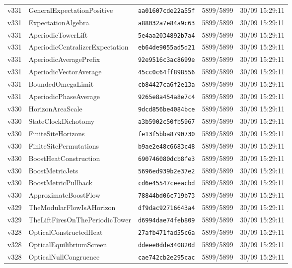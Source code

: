 \documentclass[11pt]{article}
\theoremstyle{definition}\newtheorem{deriv}{Derivation}
\begin{document}
{\begin{longtable}{@{}lllll@{}}
v331 & GeneralExpectationPositive & \texttt{aa01607cde22a55f} & 5899/5899 & 30/09 15:29:11 \\
v331 & ExpectationAlgebra & \texttt{a88032a7e84a9c63} & 5899/5899 & 30/09 15:29:11 \\
v331 & AperiodicTowerLift & \texttt{5e4aa2034892b7a4} & 5899/5899 & 30/09 15:29:11 \\
v331 & AperiodicCentralizerExpectation & \texttt{eb64de9055ad5d21} & 5899/5899 & 30/09 15:29:11 \\
v331 & AperiodicAveragePrefix & \texttt{92e9516c3ac8699e} & 5899/5899 & 30/09 15:29:11 \\
v331 & AperiodicVectorAverage & \texttt{45cc0c64ff898556} & 5899/5899 & 30/09 15:29:11 \\
v331 & BoundedOmegaLimit & \texttt{cb84427ca6f2e13a} & 5899/5899 & 30/09 15:29:11 \\
v331 & AperiodicPhaseAverage & \texttt{9265e8a454a8e7c4} & 5899/5899 & 30/09 15:29:11 \\
v330 & HorizonAreaScale & \texttt{9dcd856be4084bce} & 5899/5899 & 30/09 15:29:11 \\
v330 & StateClockDichotomy & \texttt{a3b5902c50fb5967} & 5899/5899 & 30/09 15:29:11 \\
v330 & FiniteSiteHorizons & \texttt{fe13f5bba8790730} & 5899/5899 & 30/09 15:29:11 \\
v330 & FiniteSitePermutations & \texttt{b9ae2e48c6683c48} & 5899/5899 & 30/09 15:29:11 \\
v330 & BoostHeatConstruction & \texttt{690746080dcb8fe3} & 5899/5899 & 30/09 15:29:11 \\
v330 & BoostMetricJets & \texttt{5696ed939b2e37e2} & 5899/5899 & 30/09 15:29:11 \\
v330 & BoostMetricPullback & \texttt{cd6e45547ceeacbd} & 5899/5899 & 30/09 15:29:11 \\
v330 & ApproximateBoostFlow & \texttt{78844bd06c719b73} & 5899/5899 & 30/09 15:29:11 \\
v329 & TheModularFlowIsAHorizon & \texttt{df9dac92716643a4} & 5899/5899 & 30/09 15:29:11 \\
v329 & TheLiftFiresOnThePeriodicTower & \texttt{d6994dae74feb809} & 5899/5899 & 30/09 15:29:11 \\
v328 & OpticalConstructedHeat & \texttt{27afb471fad55c6a} & 5899/5899 & 30/09 15:29:11 \\
v328 & OpticalEquilibriumScreen & \texttt{ddeee0dde340820d} & 5899/5899 & 30/09 15:29:11 \\
v328 & OpticalNullCongruence & \texttt{cae742cb2e295cac} & 5899/5899 & 30/09 15:29:11 \\

\end{longtable}}
\end{document}
